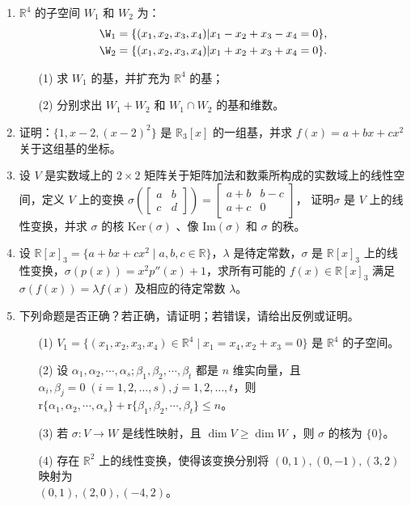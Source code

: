 \begin{enumerate}
    \item \(\mathbb{R}^4\) 的子空间 \(W_1\) 和 \(W_2\) 为：
    \begin{align*}
        \W_1 = \{ (x_1,x_2,x_3,x_4) | x_1 - x_2 + x_3 - x_4 = 0 \}, \\
        \W_2 = \{ (x_1,x_2,x_3,x_4) | x_1 + x_2 + x_3 + x_4 = 0 \}.
    \end{align*}
    \begin{enumerate}
        \item[(1)] 求 \(W_1\) 的基，并扩充为 \(\mathbb{R}^4\) 的基；
        \item[(2)] 分别求出 \(W_1+W_2\) 和 \(W_1\cap W_2\) 的基和维数。
    \end{enumerate}

    \item 证明：\(\{1,x-2,(x-2)^2\}\) 是 \(\mathbb{R}_3[x]\) 的一组基，并求 \(f(x)=a+bx+cx^2\) 关于这组基的坐标。

    \item 设 \(V\) 是实数域上的 \(2\times2\) 矩阵关于矩阵加法和数乘所构成的实数域上的线性空间，定义 \(V\) 上的变换
    \(\sigma\left(\left[\begin{matrix}
        a & b \\
        c & d
    \end{matrix}\right]\right)= \left[\begin{matrix}
        a + b & b - c \\
        a + c & 0
    \end{matrix}\right]
    \)，
    证明\(\sigma\) 是 \(V\) 上的线性变换，并求 \(\sigma\) 的核 \(\text{Ker}(\sigma)\) 、像 \(\text{Im}(\sigma)\) 和 \(\sigma\) 的秩。

    \item 设 $\mathbb{R}[x]_3 = \{a + bx + cx^2 \mid a, b, c \in \mathbb{R}\}$，$\lambda$ 是待定常数，$\sigma$ 是 $\mathbb{R}[x]_3$ 上的线性变换，$\sigma(p(x)) = x^2 p''(x) + 1$，求所有可能的 $f(x) \in \mathbb{R}[x]_3$ 满足 $\sigma(f(x)) = \lambda f(x)$ 及相应的待定常数 $\lambda$。

    \item 下列命题是否正确？若正确，请证明；若错误，请给出反例或证明。
    \begin{enumerate}
        \item[(1)] \(V_1 = \{(x_1,x_2,x_3,x_4)\in \mathbb{R}^4 \mid x_1 = x_4, x_2 + x_3 = 0\}\) 是 \(\mathbb{R}^4\) 的子空间。
        \item[(2)] 设 \(\alpha_1,\alpha_2,\cdots,\alpha_s;\beta_1,\beta_2,\cdots,\beta_t\) 都是 \(n\) 维实向量，且 \(\alpha_i,\beta_j=0\;(i=1,2,\dots,s),j=1,2,\dots,t\)，则 \(\text{r}\{\alpha_1,\alpha_2,\cdots,\alpha_s\}+\text{r}\{\beta_1,\beta_2,\cdots,\beta_t\} \leq n\)。
        \item[(3)] 若 \(\sigma:V\rightarrow W\) 是线性映射，且 \(\dim V \ge \dim W\) ，则 \(\sigma\) 的核为 \(\{0\}\)。
        \item[(4)] 存在 \(\mathbb{R}^2\) 上的线性变换，使得该变换分别将 \((0,1),(0,-1),(3,2)\) 映射为 \\
        \((0,1),(2,0),(-4,2)\)。
    \end{enumerate}
\end{enumerate}

\clearpage

